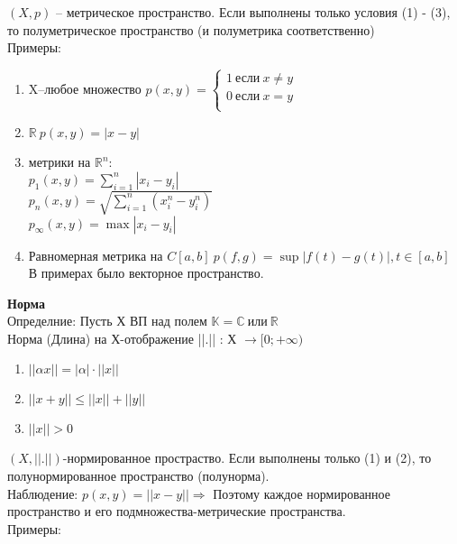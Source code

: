 	$(X,p)$ -- метрическое пространство. Если выполнены только условия (1) - (3), то полуметрическое пространство (и полуметрика соответственно)\\
	Примеры:
	\begin{enumerate}
		\item
		X--любое множество 
		$p(x,y)=
		\begin{cases}
		1\ \text{если}\ x\neq y\\
		0\ \text{если}\ x = y\\
		\end{cases}$
		
		\item
		$\mathbb{R}\ p(x,y) = |x - y|$
		
		\item
		метрики на $\mathbb{R}^{n}$:\\
		$p_1 (x,y) = \sum_{i = 1}^n |x_i- y_i|$\\
		$p_n (x,y) = \sqrt{\sum_{i = 1}^n (x_i^n-y_i^n)}$\\
		$p_\infty (x,y) = \max|x_i-y_i|$
		
		\item
		Равномерная метрика на $C[a,b]\ p(f,g) = \sup|f(t)-g(t)|, t\in [a,b]$\\
		В примерах было векторное пространство.	
	\end{enumerate}
	\textbf{Норма}\\
	Определние: Пусть Х ВП над полем $\mathbb{K} = \mathbb{C}\ \text{или}\ \mathbb{R}$\\
	Норма (Длина) на Х-отображение ||.|| : Х $\rightarrow [0;+ \infty)$
	\begin{enumerate}
		\item $||\alpha x||=|\alpha|\cdot ||x||$
		\item $||x + y|| \leqslant ||x||+||y||$
		\item $||x||>0$
	\end{enumerate}
	$(X, ||.||)$-нормированное простраство.
	Если выполнены только (1) и (2), то полунормированное пространство (полунорма).\\
	Наблюдение: $p(x,y) = ||x - y|| \Rightarrow $ Поэтому каждое нормированное пространство и его подмножества-метрические пространства.\\
	Примеры:
